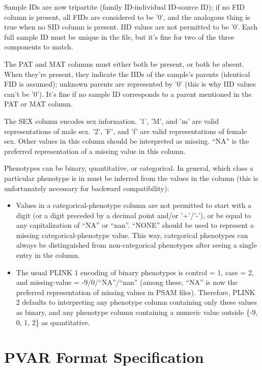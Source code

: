 \documentclass[8pt]{article}
\begin{document}
Sample IDs are now tripartite (family ID-individual ID-source ID); if no FID
column is present, all FIDs are considered to be '0', and the analogous thing
is true when no SID column is present.  IID values are not permitted to be '0'.
Each full sample ID must be unique in the file, but it's fine for two of the
three components to match.

The PAT and MAT columns must either both be present, or both be absent.  When
they're present, they indicate the IIDs of the sample's parents (identical FID
is assumed); unknown parents are represented by '0' (this is why IID values
can't be '0').  It's fine if no sample ID corresponds to a parent mentioned in
the PAT or MAT column.

The SEX column encodes sex information.  '1', 'M', and 'm' are valid
representations of male sex.  '2', 'F', and 'f' are valid representations of
female sex.  Other values in this column should be interpreted as missing.
``NA'' is the preferred representation of a missing value in this column.

Phenotypes can be binary, quantitative, or categorical.  In general, which
class a particular phenotype is in must be inferred from the values in the
column (this is unfortunately necessary for backward compatibility):

\begin{itemize}
\item Values in a categorical-phenotype column are not permitted to start with
  a digit (or a digit preceded by a decimal point and/or '+'/'-'), or be equal
  to any capitalization of ``NA'' or ``nan''.  ``NONE'' should be used to
  represent a missing categorical-phenotype value.  This way, categorical
  phenotypes can always be distinguished from non-categorical phenotypes after
  seeing a single entry in the column.
\item The usual PLINK 1 encoding of binary phenotypes is control = 1, case = 2,
  and missing-value = -9/0/``NA''/``nan'' (among these, ``NA'' is now the
  preferred representation of missing values in PSAM files).  Therefore, PLINK
  2 defaults to interpreting any phenotype column containing only these values
  as binary, and any phenotype column containing a numeric value outside \{-9,
  0, 1, 2\} as quantitative.
\end{itemize}

\newpage
\section{PVAR Format Specification}
\end{document}
